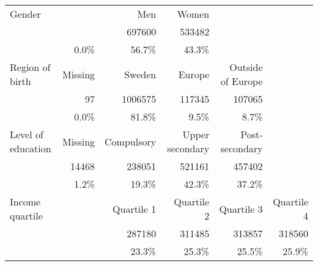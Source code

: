 \begin{tabular}{@{}l*{5}{r}@{}}
\toprule
Gender              &               & {Men}         & {Women}           &                     &                 \tabularnewline
                    &               & \num{697600}  & \num{533482}      &                     &                 \tabularnewline
                    & 0.0\%         & 56.7\%        & 43.3\%            &                     &                 \tabularnewline
\midrule
Region of birth     & {Missing}     & {Sweden}      & {Europe}          & {Outside of Europe} &                 \tabularnewline
                    & \num{97}      & \num{1006575} & \num{117345}      & \num{107065}        &                 \tabularnewline
                    & 0.0\%         & 81.8\%        & 9.5\%             & 8.7\%               &                 \tabularnewline
\midrule
Level of education  & {Missing}     & {Compulsory}  & {Upper secondary} & {Post-secondary}    &                 \tabularnewline
                    & \num{14468}   & \num{238051}  & \num{521161}      & \num{457402}        &                 \tabularnewline
                    & 1.2\%         & 19.3\%        & 42.3\%            & 37.2\%              &                 \tabularnewline
\midrule
Income quartile     &               & {Quartile 1}  & {Quartile 2}      & {Quartile 3}        & {Quartile 4}    \tabularnewline
                    &               & \num{287180}  & \num{311485}      & \num{313857}        & \num{318560}    \tabularnewline
                    &               & 23.3\%        & 25.3\%            & 25.5\%              & 25.9\%          \tabularnewline
\bottomrule
\end{tabular}